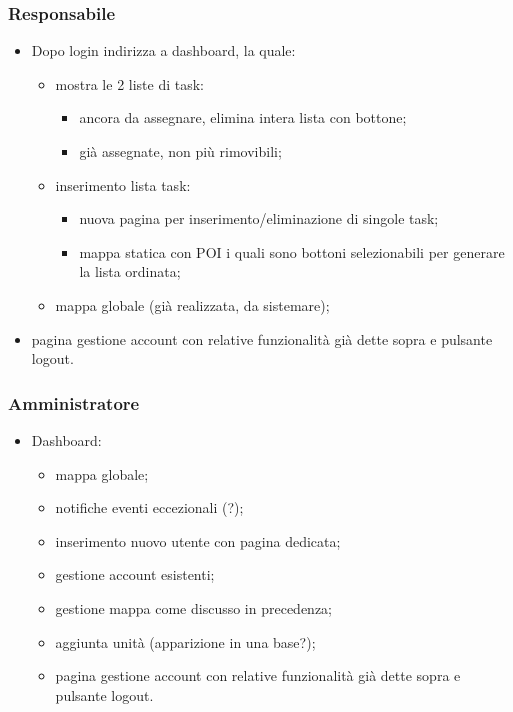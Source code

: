     \subsubsection{Responsabile}
        \begin{itemize}
            \item Dopo login indirizza a dashboard, la quale:
            \begin{itemize}
                \item mostra le 2 liste di task:
                \begin{itemize}
                    \item ancora da assegnare, elimina intera lista con bottone;
                    \item già assegnate, non più rimovibili;
                \end{itemize}
                \item inserimento lista task:
                \begin{itemize}
                    \item nuova pagina per inserimento/eliminazione di singole task;
                    \item mappa statica con POI i quali sono bottoni selezionabili per generare la lista ordinata;
                \end{itemize}
                \item mappa globale (già realizzata, da sistemare);
            \end{itemize}
            \item pagina gestione account con relative funzionalità già dette sopra e pulsante logout.
        \end{itemize}

    \subsubsection{Amministratore}
    \begin{itemize}
        \item Dashboard:
        \begin{itemize}
            \item mappa globale;
            \item notifiche eventi eccezionali (?);
            \item inserimento nuovo utente con pagina dedicata;
            \item gestione account esistenti;
            \item gestione mappa come discusso in precedenza;
            \item aggiunta unità (apparizione in una base?);
            \item pagina gestione account con relative funzionalità già dette sopra e pulsante logout.
        \end{itemize}
    \end{itemize}




